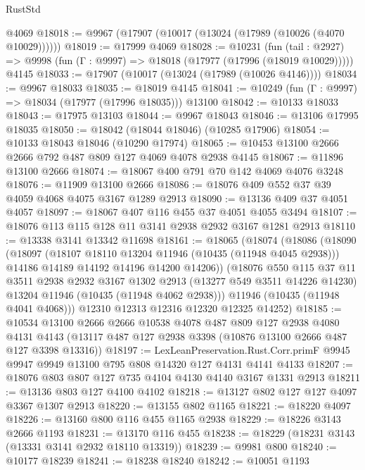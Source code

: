 \begin{lexlean}{RustStd}
\begin{coremodule}
{\begin{coremodule}
{{{{{{{{{{{{{{{{{{{{{{{{{{{{{{{{{{{{{{{{{{{{{{{{{{{{{{{{{{{{{{{{{{{{{{{{{{{{{{    @4069
@18018 := @9967 (@17907 (@10017 (@13024 (@17989 (@10026 (@4070 @10029))))))
@18019 := @17999 @4069
@18028 := @10231
    (fun (tail : @2927) => @9998 (fun (Γ : @9997) => @18018 (@17977 (@17996 (@18019 @10029)))))
    @4145
@18033 := @17907 (@10017 (@13024 (@17989 (@10026 @4146))))
@18034 := @9967 @18033
@18035 := @18019 @4145
@18041 := @10249 (fun (Γ : @9997) => @18034 (@17977 (@17996 @18035))) @13100
@18042 := @10133 @18033
@18043 := @17975 @13103
@18044 := @9967 @18043
@18046 := @13106 @17995 @18035
@18050 := @18042 (@18044 @18046) (@10285 @17906)
@18054 := @10133 @18043 @18046 (@10290 @17974)
@18065 := @10453 @13100 @2666 @2666 @792 @487 @809 @127 @4069 @4078 @2938 @4145
@18067 := @11896 @13100 @2666
@18074 := @18067 @400 @791 @70 @142 @4069 @4076 @3248
@18076 := @11909 @13100 @2666
@18086 := @18076 @409 @552 @37 @39 @4059 @4068 @4075 @3167 @1289 @2913
@18090 := @13136 @409 @37 @4051 @4057
@18097 := @18067 @407 @116 @455 @37 @4051 @4055 @3494
@18107 := @18076 @113 @115 @128 @11 @3141 @2938 @2932 @3167 @1281 @2913
@18110 := @13338 @3141 @13342 @11698
@18161 := @18065
    (@18074
      (@18086
        (@18090
          (@18097
            (@18107 @18110 @13204 @11946 (@10435 (@11948 @4045 @2938)))
            @14186
            @14189
            @14192
            @14196
            @14200
            @14206))
        (@18076
          @550
          @115
          @37
          @11
          @3511
          @2938
          @2932
          @3167
          @1302
          @2913
          (@13277 @549 @3511 @14226 @14230)
          @13204
          @11946
          (@10435 (@11948 @4062 @2938)))
        @11946
        (@10435 (@11948 @4041 @4068)))
      @12310
      @12313
      @12316
      @12320
      @12325
      @14252)
@18185 := @10534
    @13100
    @2666
    @2666
    @10538
    @4078
    @487
    @809
    @127
    @2938
    @4080
    @4131
    @4143
    (@13117 @487 @127 @2938 @3398 (@10876 @13100 @2666 @487 @127 @3398 @13316))
@18197 := LexLeanPreservation.Rust.Corr.primF
    @9945
    @9947
    @9949
    @13100
    @795
    @808
    @14320
    @127
    @4131
    @4141
    @4133
@18207 := @18076 @803 @807 @127 @735 @4104 @4130 @4140 @3167 @1331 @2913
@18211 := @13136 @803 @127 @4100 @4102
@18218 := @13127 @802 @127 @127 @4097 @3367 @1307 @2913
@18220 := @13155 @802 @1165
@18221 := @18220 @4097
@18226 := @13160 @800 @116 @455 @1165 @2938
@18229 := @18226 @3143 @2666 @1193
@18231 := @13170 @116 @455
@18238 := @18229 (@18231 @3143 (@13331 @3141 @2932 @18110 @13319))
@18239 := @9981 @800
@18240 := @10177 @18239
@18241 := @18238 @18240
@18242 := @10051 @1193
}}}}}}}}}}}}}}}}}}}}}}}}}}}}}}}}}}}}}}}}}}}}}}}}}}}}}}}}}}}}}}}}}}}}}}}}}}}}}}
\end{coremodule}}
\end{coremodule}
\end{lexlean}
